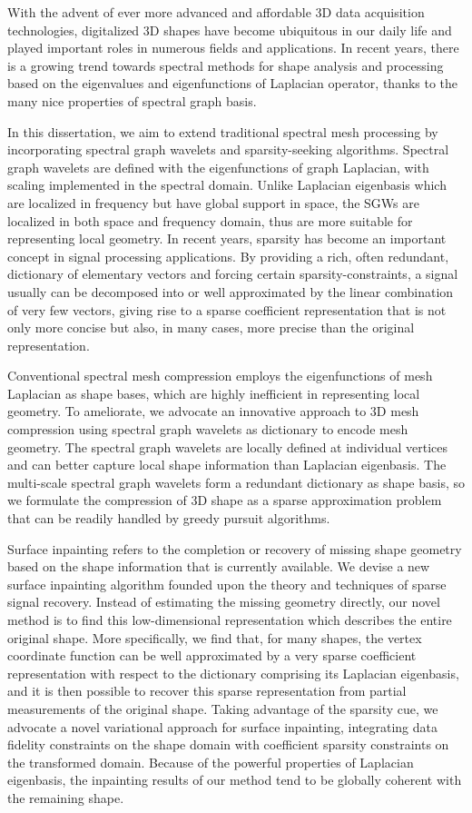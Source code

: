 \documentclass[12pt,letterpaper,twosided]{report}
\numberwithin{equation}{section}
\begin{document}
With the advent of ever more advanced and affordable 3D data acquisition
technologies, digitalized 3D shapes have become ubiquitous in our daily life
and played important roles in numerous fields and applications. In recent
years, there is a growing trend towards spectral methods for shape analysis
and processing based on the eigenvalues and eigenfunctions of Laplacian operator,
thanks to the many nice properties of spectral graph basis.

In this dissertation, we aim to extend traditional spectral mesh processing
by incorporating spectral graph wavelets and sparsity-seeking
algorithms. Spectral graph wavelets are defined with the eigenfunctions of
graph Laplacian, with scaling implemented in the spectral domain. Unlike
Laplacian eigenbasis which are localized in frequency but have global support
in space, the SGWs are localized in both space and frequency domain, thus are
more suitable for representing local geometry. In recent years, sparsity has
become an important concept in signal processing applications. By providing a
rich, often redundant, dictionary of elementary vectors and forcing certain
sparsity-constraints, a signal usually can be decomposed into or well
approximated by the linear combination of very few vectors, giving rise to a
sparse coefficient representation that is not only more concise but also, in
many cases, more precise than the original representation.

Conventional spectral mesh compression employs the eigenfunctions of mesh
Laplacian as shape bases, which are highly inefficient in representing local
geometry. To ameliorate, we advocate an innovative approach to 3D mesh
compression using spectral graph wavelets as dictionary to encode mesh geometry.
The spectral graph wavelets are locally defined at individual vertices and can
better capture local shape information than Laplacian eigenbasis. The
multi-scale spectral graph wavelets form a redundant dictionary as shape basis,
so we formulate the compression of 3D shape as a sparse approximation problem
that can be readily handled by greedy pursuit algorithms.

Surface inpainting refers to the completion or recovery of missing shape
geometry based on the shape information that is currently available. We
devise a new surface inpainting algorithm founded upon the theory and
techniques of sparse signal recovery. Instead of estimating the missing
geometry directly, our novel method is to find this low-dimensional
representation which describes the entire original shape. More specifically,
we find that, for many shapes, the vertex coordinate function can be well
approximated by a very sparse coefficient representation with respect to the
dictionary comprising its Laplacian eigenbasis, and it is then possible to
recover this sparse representation from partial measurements of the original
shape. Taking advantage of the sparsity cue, we advocate a novel variational
approach for surface inpainting, integrating data fidelity constraints on the
shape domain with coefficient sparsity constraints on the transformed domain.
Because of the powerful properties of Laplacian eigenbasis, the inpainting
results of our method tend to be globally coherent with the remaining shape.
\end{document}
